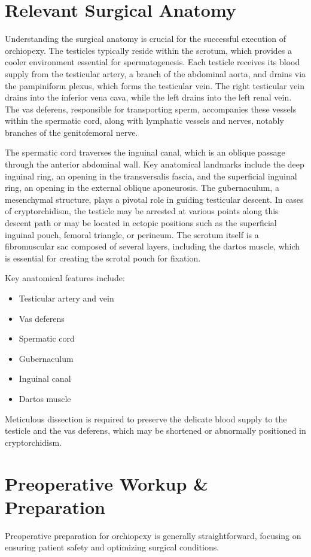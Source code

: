 \section*{Relevant Surgical Anatomy}
Understanding the surgical anatomy is crucial for the successful execution of orchiopexy. The testicles typically reside within the scrotum, which provides a cooler environment essential for spermatogenesis. Each testicle receives its blood supply from the testicular artery, a branch of the abdominal aorta, and drains via the pampiniform plexus, which forms the testicular vein. The right testicular vein drains into the inferior vena cava, while the left drains into the left renal vein. The vas deferens, responsible for transporting sperm, accompanies these vessels within the spermatic cord, along with lymphatic vessels and nerves, notably branches of the genitofemoral nerve.

The spermatic cord traverses the inguinal canal, which is an oblique passage through the anterior abdominal wall. Key anatomical landmarks include the deep inguinal ring, an opening in the transversalis fascia, and the superficial inguinal ring, an opening in the external oblique aponeurosis. The gubernaculum, a mesenchymal structure, plays a pivotal role in guiding testicular descent. In cases of cryptorchidism, the testicle may be arrested at various points along this descent path or may be located in ectopic positions such as the superficial inguinal pouch, femoral triangle, or perineum. The scrotum itself is a fibromuscular sac composed of several layers, including the dartos muscle, which is essential for creating the scrotal pouch for fixation. 

Key anatomical features include:

\begin{itemize}
  \item Testicular artery and vein
  \item Vas deferens
  \item Spermatic cord
  \item Gubernaculum
  \item Inguinal canal
  \item Dartos muscle
\end{itemize}

Meticulous dissection is required to preserve the delicate blood supply to the testicle and the vas deferens, which may be shortened or abnormally positioned in cryptorchidism.

\section*{Preoperative Workup \& Preparation}
Preoperative preparation for orchiopexy is generally straightforward, focusing on ensuring patient safety and optimizing surgical conditions.

